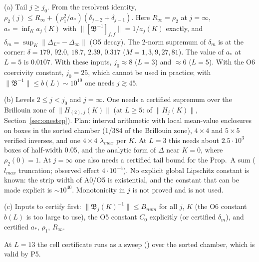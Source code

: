 (a) Tail $j\ge j_0$. From the resolvent identity, $\rho_2(j)\le R_\infty+(\rho_1^2/a_*)(\delta_{j-2}+\delta_{j-1})$. Here $R_\infty=\rho_2$ at $j=\infty$, $a_*=\inf_Ka_j(K)$ with $\|[\mathfrak B^{-1}]_{f,f}\|=1/a_j(K)$ exactly, and $\delta_m=\sup_K\|\Delta_{L^m}-\Delta_\infty\|$ (O5 decay). The 2-norm supremum of $\delta_m$ is at the corner: $\delta=179,\,92.0,\,18.7,\,2.39,\,0.317$ ($M=1,3,9,27,81$). The value of $a_*$ at $L=5$ is $0.0107$. With these inputs, $j_0\approx8$ ($L=3$) and $\approx6$ ($L=5$). With the O6 coercivity constant, $j_0=25$, which cannot be used in practice; with $\|\mathfrak B^{-1}\|\le b(L)\sim10^{19}$ one needs $j\gtrsim45$.

(b) Levels $2\le j<j_0$ and $j=\infty$. One needs a certified supremum over the Brillouin zone of $\|H_{(2),j}(K)\|$ (at $L\ge5$: of $\|H_j(K)\|$, Section~\ref{sec:onestep}). Plan: interval arithmetic with local mean-value enclosures on boxes in the sorted chamber (1/384 of the Brillouin zone), $4\times4$ and $5\times5$ verified inverses, and one $4\times4$ $\lambda_{max}$ per $K$. At $L=3$ this needs about $2.5\cdot10^3$ boxes of half-width 0.05, and the analytic form of $\Delta$ near $K=0$, where $\rho_2(0)=1$. At $j=\infty$ one also needs a certified tail bound for the Prop.\ A sum ($l_{max}$ truncation; observed effect $4\cdot10^{-4}$). No explicit global Lipschitz constant is known: the strip width of A0/O5 is existential, and the constant that can be made explicit is $\sim10^{40}$. Monotonicity in $j$ is not proved and is not used.

(c) Inputs to certify first: $\|\mathfrak B_j(K)^{-1}\|\le B_{num}$ for all $j$, $K$ (the O6 constant $b(L)$ is too large to use), the O5 constant $C_0$ explicitly (or certified $\delta_m$), and certified $a_*$, $\rho_1$, $R_\infty$.

At $L=13$ the cell certificate runs as a sweep () over the sorted chamber, which is valid by P5.
